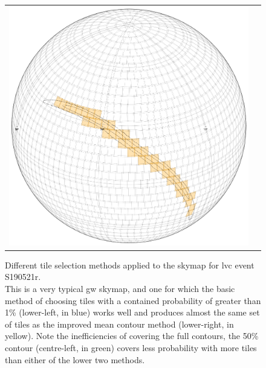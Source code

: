 \begin{colsection}
\begin{colsection}
\begin{figure}[p]
\begin{center}
\begin{tabular}{cc}
\includegraphics[width=0.25\linewidth]{images/tiling/1_b.png}
\\

\end{tabular}
\end{center}
\caption[Different tile selection methods for S190521r]{Different tile selection methods applied to the skymap for \gls{lvc} event S190521r.\\
This is a very typical \gls{gw} skymap, and one for which the basic method of choosing tiles with a contained probability of greater than 1\% (lower-left, in blue) works well and produces almost the same set of tiles as the improved mean contour method (lower-right, in yellow). Note the inefficiencies of covering the full contours, the 50\% contour (centre-left, in green) covers less probability with more tiles than either of the lower two methods.
}
\label{fig:tiling_S190521r}
\end{figure}



\end{colsection}
\end{colsection}
